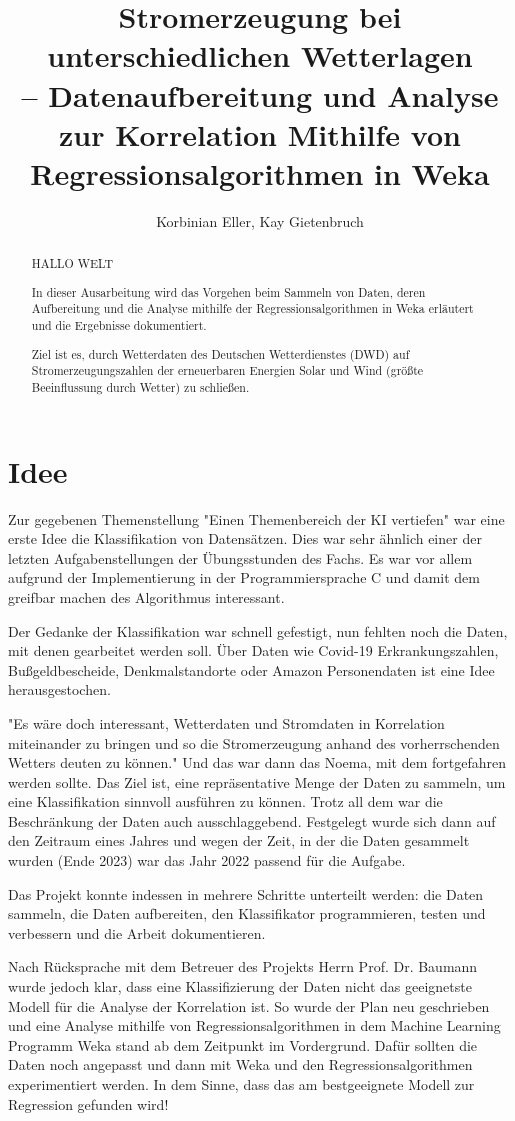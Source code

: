 \documentclass[letterpaper]{article} %
\title{Stromerzeugung bei unterschiedlichen Wetterlagen\\-- Datenaufbereitung und Analyse zur Korrelation Mithilfe von Regressionsalgorithmen in Weka}
\author {
    Korbinian Eller,
    Kay Gietenbruch
}
\begin{document}
\maketitle
\begin{abstract}

    HALLO WELT


    In dieser Ausarbeitung wird das Vorgehen beim Sammeln von Daten, deren Aufbereitung und die Analyse mithilfe der Regressionsalgorithmen in Weka erläutert und die Ergebnisse dokumentiert.
    
    Ziel ist es, durch Wetterdaten des Deutschen Wetterdienstes (DWD) auf Stromerzeugungszahlen der erneuerbaren Energien Solar und Wind (größte Beeinflussung durch Wetter) zu schließen.
\end{abstract}
\section*{Idee}
    Zur gegebenen Themenstellung "Einen Themenbereich der KI vertiefen" war eine erste Idee die Klassifikation von Datensätzen. Dies war sehr ähnlich einer der letzten Aufgabenstellungen der Übungsstunden des Fachs. Es war vor allem aufgrund der Implementierung in der Programmiersprache C und damit dem greifbar machen des Algorithmus interessant.

    Der Gedanke der Klassifikation war schnell gefestigt, nun fehlten noch die Daten, mit denen gearbeitet werden soll. Über Daten wie Covid-19 Erkrankungszahlen, Bußgeldbescheide, Denkmalstandorte oder Amazon Personendaten ist eine Idee herausgestochen.

    "Es wäre doch interessant, Wetterdaten und Stromdaten in Korrelation miteinander zu bringen und so die Stromerzeugung anhand des vorherrschenden Wetters deuten zu können." Und das war dann das Noema, mit dem fortgefahren werden sollte. Das Ziel ist, eine repräsentative Menge der Daten zu sammeln, um eine Klassifikation sinnvoll ausführen zu können. Trotz all dem war die Beschränkung der Daten auch ausschlaggebend. Festgelegt wurde sich dann auf den Zeitraum eines Jahres und wegen der Zeit, in der die Daten gesammelt wurden (Ende 2023) war das Jahr 2022 passend für die Aufgabe.
    
    Das Projekt konnte indessen in mehrere Schritte unterteilt werden: die Daten sammeln, die Daten aufbereiten, den Klassifikator programmieren, testen und verbessern und die Arbeit dokumentieren.

    Nach Rücksprache mit dem Betreuer des Projekts Herrn Prof. Dr. Baumann wurde jedoch klar, dass eine Klassifizierung der Daten nicht das geeignetste Modell für die Analyse der Korrelation ist. So wurde der Plan neu geschrieben und eine Analyse mithilfe von Regressionsalgorithmen in dem Machine Learning Programm Weka stand ab dem Zeitpunkt im Vordergrund. Dafür sollten die Daten noch angepasst und dann mit Weka und den Regressionsalgorithmen experimentiert werden. In dem Sinne, dass das am bestgeeignete Modell zur Regression gefunden wird!
\end{document}
